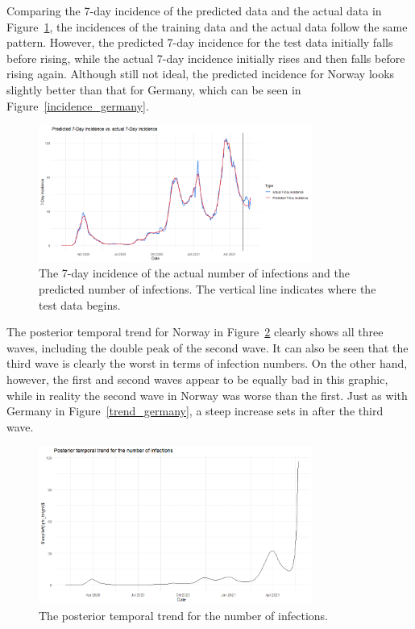Comparing the 7-day incidence of the predicted data and the actual data in Figure~\ref{incidence_norway}, the incidences of the training data and the actual data follow the same pattern. However, the predicted 7-day incidence for the test data initially falls before rising, while the actual 7-day incidence initially rises and then falls before rising again. Although still not ideal, the predicted incidence for Norway looks slightly better than that for Germany, which can be seen in Figure~\ref{incidence_germany}.
\begin{figure}[H]
  \centering
  \includegraphics[width = 0.8\textwidth]{incidence_norway.png}  
  \caption{The 7-day incidence of the actual number of infections and the predicted number of infections. The vertical line indicates where the test data begins.}
  \label{incidence_norway}
\end{figure}
The posterior temporal trend for Norway in Figure~\ref{trend_norway} clearly shows all three waves, including the double peak of the second wave. It can also be seen that the third wave is clearly the worst in terms of infection numbers. On the other hand, however, the first and second waves appear to be equally bad in this graphic, while in reality the second wave in Norway was worse than the first. Just as with Germany in Figure~\ref{trend_germany}, a steep increase sets in after the third wave.
\begin{figure}[H]
  \centering
  \includegraphics[width = 0.8\textwidth]{temp_trend_norway.png}  
  \caption{The posterior temporal trend for the number of infections.}
  \label{trend_norway}
\end{figure}

